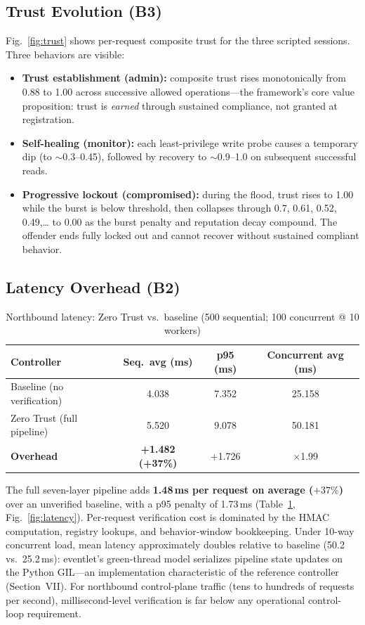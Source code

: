 \documentclass[journal]{IEEEtran}
\begin{document}
\subsection{Trust Evolution (B3)}
Fig.~\ref{fig:trust} shows per-request composite trust for the three scripted sessions. Three behaviors are visible:
\begin{itemize}
\item \textbf{Trust establishment (admin):} composite trust rises monotonically from 0.88 to 1.00 across successive allowed operations---the framework's core value proposition: trust is \emph{earned} through sustained compliance, not granted at registration.
\item \textbf{Self-healing (monitor):} each least-privilege write probe causes a temporary dip (to $\sim$0.3--0.45), followed by recovery to $\sim$0.9--1.0 on subsequent successful reads.
\item \textbf{Progressive lockout (compromised):} during the flood, trust rises to 1.00 while the burst is below threshold, then collapses through 0.7, 0.61, 0.52, 0.49,\ldots{} to 0.00 as the burst penalty and reputation decay compound. The offender ends fully locked out and cannot recover without sustained compliant behavior.
\end{itemize}

\subsection{Latency Overhead (B2)}
\begin{table}[t]
\centering
\caption{Northbound latency: Zero Trust vs.\ baseline (500 sequential; 100 concurrent @ 10 workers)}
\label{tab:b2}
\begin{tabular}{@{}lccc@{}}
\toprule
Controller & Seq.\ avg (ms) & p95 (ms) & Concurrent avg (ms)\\
\midrule
Baseline (no verification) & 4.038 & 7.352 & 25.158\\
Zero Trust (full pipeline) & 5.520 & 9.078 & 50.181\\
\midrule
\textbf{Overhead} & \textbf{+1.482 (+37\%)} & +1.726 & $\times$1.99\\
\bottomrule
\end{tabular}
\end{table}
The full seven-layer pipeline adds \textbf{1.48\,ms per request on average ($+37\%$)} over an unverified baseline, with a p95 penalty of 1.73\,ms (Table~\ref{tab:b2}, Fig.~\ref{fig:latency}). Per-request verification cost is dominated by the HMAC computation, registry lookups, and behavior-window bookkeeping. Under 10-way concurrent load, mean latency approximately doubles relative to baseline (50.2 vs.\ 25.2\,ms): eventlet's green-thread model serializes pipeline state updates on the Python GIL---an implementation characteristic of the reference controller (Section~VII). For northbound control-plane traffic (tens to hundreds of requests per second), millisecond-level verification is far below any operational control-loop requirement.
\end{document}
